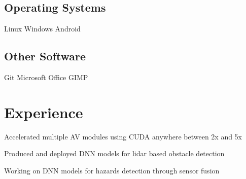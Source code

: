 \documentclass[]{deedy-resume-openfont}
\begin{document}
\begin{minipage}[t]{0.3\textwidth}
\subsection{Operating Systems}
Linux \textbullet{} Windows \textbullet{} Android \\
\sectionsep
\subsection{Other Software}
Git \textbullet{} Microsoft Office \textbullet{} GIMP \\
\sectionsep

%
%

\end{minipage}
\hfill
\begin{minipage}[t]{0.69\textwidth}


\section{Experience}

\vspace{\topsep} %
\begin{tightemize}
\item Accelerated multiple AV modules using CUDA anywhere between 2x and 5x
\item Produced and deployed DNN models for lidar based obstacle detection
\item Working on DNN models for hazards detection through sensor fusion
\end{tightemize}
\sectionsep


\end{minipage}
\end{document}
